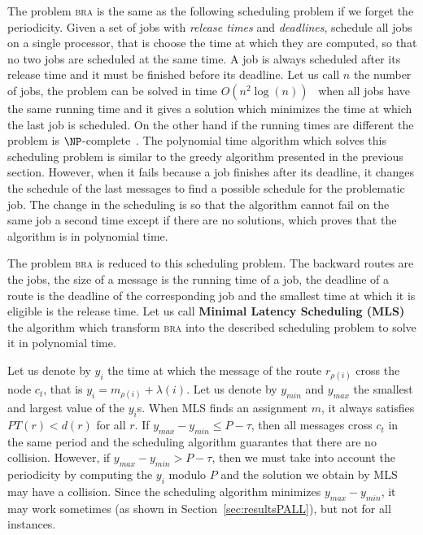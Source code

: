 \documentclass[10pt, conference, letterpaper]{IEEEtran}
\newcommand\bra{\textsc{bra}\xspace}
\begin{document}
     
     The problem \bra is the same as the following scheduling problem if we forget the periodicity. Given a set of jobs with \emph{release times} and  \emph{deadlines}, schedule all jobs on a single processor, that is choose the time at which they are computed, so that no two jobs are scheduled at the same time. A job is always scheduled after its release time and it must be finished before its deadline. Let us call $n$ the number of jobs, the problem can be solved in time $O(n^2\log(n))$~\cite{simons1978fast} when all jobs have the same running time and it gives a solution which minimizes the time at which the last job is scheduled. On the other hand if the running times are different the problem is $\NP$-complete~\cite{lenstra1977complexity}. 
     The  polynomial time algorithm  which solves this scheduling problem is similar to the greedy algorithm presented in the previous section. However, when it fails because a job finishes after its deadline, it changes the schedule of the last messages to find a possible schedule for the problematic job. The change in the scheduling is so that the algorithm cannot fail on the same job a second time except if there are no solutions, which proves that the algorithm is in polynomial time.
     
     The problem \bra is reduced to this scheduling problem. The backward routes are the jobs, the size of a message is the running time of a job, the deadline of a route is the deadline of the corresponding job and the smallest time at which it is eligible is the release time. Let us call {\bf Minimal Latency Scheduling (MLS)} the algorithm which transform \bra into the described scheduling problem to solve it in polynomial time.
     
     Let us denote by $y_i$ the time at which the message of the route $r_{\rho(i)}$ cross the node $c_t$,
     that is $y_i = m_{\rho(i)} + \lambda(i)$. Let us denote by $y_{min}$ and $y_{max}$ the smallest and largest value of the $y_i$s. When MLS finds an assignment $m$, it always satisfies $PT(r) < d(r)$ for all $r$. If $y_{max}- y_{min} \leq P -\tau $, then all messages cross $c_t$ in the same period and 
     the scheduling algorithm guarantes that there are no collision. However, if $y_{max}- y_{min} > P -\tau $, then we must take into account the periodicity by computing the $y_i$ modulo $P$ and the solution we obtain by MLS may have a collision. Since the scheduling algorithm minimizes $y_{max}- y_{min}$, it may work sometimes (as shown in Section~\ref{sec:resultsPALL}), but not for all instances. 
     
\end{document}
